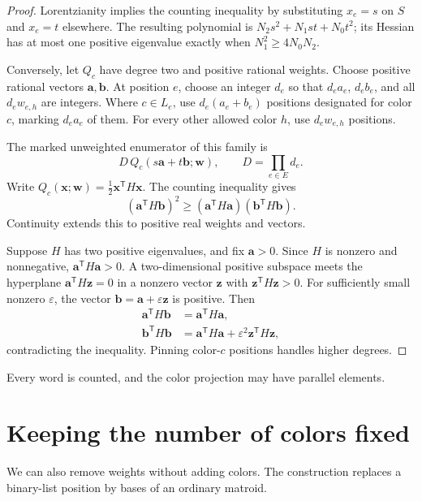 \begin{proof}
Lorentzianity implies the counting inequality by substituting $x_e=s$
on $S$ and $x_e=t$ elsewhere. The resulting polynomial is
$N_2s^2+N_1st+N_0t^2$; its Hessian has at most one positive eigenvalue
exactly when $N_1^2\geq4N_0N_2$.

Conversely, let $Q_c$ have degree two and positive rational weights.
Choose positive rational vectors $\mathbf a,\mathbf b$. At position $e$,
choose an integer $d_e$ so that $d_ea_e$, $d_eb_e$, and all $d_ew_{e,h}$
are integers. Where $c\in L_e$, use $d_e(a_e+b_e)$ positions designated
for color $c$, marking $d_ea_e$ of them. For every other allowed color
$h$, use $d_ew_{e,h}$ positions.

The marked unweighted enumerator of this family is
\[
 D\,Q_c(s\mathbf a+t\mathbf b;\mathbf w),
 \qquad D=\prod_{e\in E}d_e.
\]
Write $Q_c(\mathbf x;\mathbf w)=\tfrac12\mathbf x^{\mathsf T}H\mathbf x$.
The counting inequality gives
\[
 (\mathbf a^{\mathsf T}H\mathbf b)^2\geq
 (\mathbf a^{\mathsf T}H\mathbf a)
 (\mathbf b^{\mathsf T}H\mathbf b).
\]
Continuity extends this to positive real weights and vectors.

Suppose $H$ has two positive eigenvalues, and fix $\mathbf a>0$.
Since $H$ is nonzero and nonnegative, $\mathbf a^{\mathsf T}H\mathbf a>0$.
A two-dimensional positive subspace meets the hyperplane
$\mathbf a^{\mathsf T}H\mathbf z=0$
in a nonzero vector $\mathbf z$ with $\mathbf z^{\mathsf T}H\mathbf z>0$.
For sufficiently small nonzero $\varepsilon$, the vector
$\mathbf b=\mathbf a+\varepsilon\mathbf z$ is positive. Then
\[
 \begin{aligned}
 \mathbf a^{\mathsf T}H\mathbf b
 &=\mathbf a^{\mathsf T}H\mathbf a,\\
 \mathbf b^{\mathsf T}H\mathbf b
 &=\mathbf a^{\mathsf T}H\mathbf a
   +\varepsilon^2\mathbf z^{\mathsf T}H\mathbf z,
 \end{aligned}
\]
contradicting the inequality. Pinning color-$c$ positions handles
higher degrees.
\end{proof}

Every word is counted, and the color projection may have parallel elements.

\section[fixedPalette]{Keeping the number of colors fixed}

We can also remove weights without adding colors. The construction
replaces a binary-list position by bases of an ordinary matroid.

